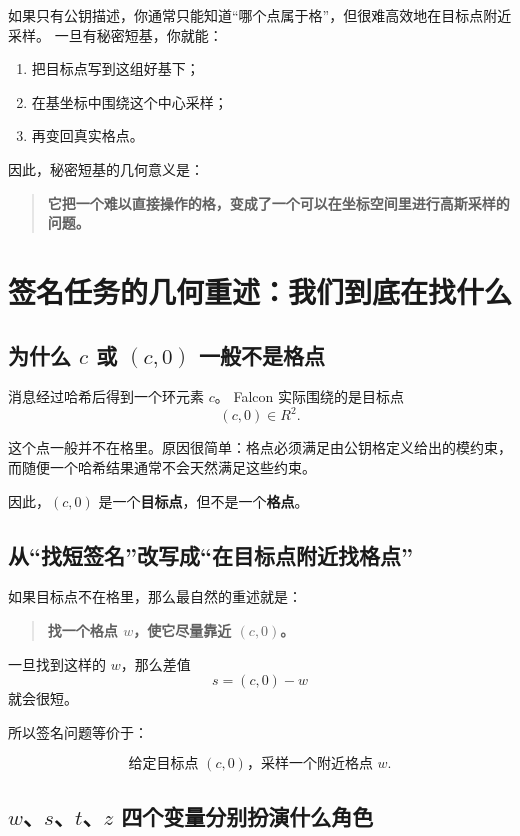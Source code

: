 \documentclass[11pt,a4paper]{ctexart}
\begin{document}
如果只有公钥描述，你通常只能知道“哪个点属于格”，但很难高效地在目标点附近采样。  
一旦有秘密短基，你就能：

\begin{enumerate}
    \item 把目标点写到这组好基下；
    \item 在基坐标中围绕这个中心采样；
    \item 再变回真实格点。
\end{enumerate}

因此，秘密短基的几何意义是：

\begin{quote}
\textbf{它把一个难以直接操作的格，变成了一个可以在坐标空间里进行高斯采样的问题。}
\end{quote}

\section{签名任务的几何重述：我们到底在找什么}

\subsection{为什么 \(c\) 或 \((c,0)\) 一般不是格点}

消息经过哈希后得到一个环元素 \(c\)。  
Falcon 实际围绕的是目标点
\[
(c,0)\in R^2.
\]

这个点一般并不在格里。原因很简单：格点必须满足由公钥格定义给出的模约束，而随便一个哈希结果通常不会天然满足这些约束。

因此，\((c,0)\) 是一个\textbf{目标点}，但不是一个\textbf{格点}。

\subsection{从“找短签名”改写成“在目标点附近找格点”}

如果目标点不在格里，那么最自然的重述就是：

\begin{quote}
\textbf{找一个格点 \(w\)，使它尽量靠近 \((c,0)\)。}
\end{quote}

一旦找到这样的 \(w\)，那么差值
\[
s=(c,0)-w
\]
就会很短。

所以签名问题等价于：

\[
\text{给定目标点 }(c,0)\text{，采样一个附近格点 }w.
\]

\subsection{\(w\)、\(s\)、\(t\)、\(z\) 四个变量分别扮演什么角色}
\end{document}
